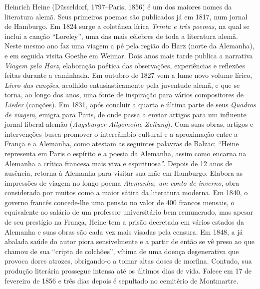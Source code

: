 \begin{resumopage}

\item[Heinrich Heine] (Düsseldorf, 1797--Paris, 1856) é um dos maiores nomes
da literatura alemã. Seus primeiros poemas são publicados já
em 1817, num jornal de Hamburgo. Em 1824 surge a coletânea lírica
\textit{Trinta e três poemas}, na qual se inclui a canção “Loreley”,
uma das mais célebres de toda a literatura alemã. Neste mesmo ano faz
uma viagem a pé pela região do Harz (norte da Alemanha), e em seguida
visita Goethe em Weimar. Dois anos mais tarde publica a narrativa
\textit{Viagem pelo Harz}, elaboração poética das observações,
experiências e reflexões feitas durante a caminhada. Em outubro de 1827
vem a lume novo volume lírico, \textit{Livro das canções}, acolhido
entusiasticamente pela juventude alemã, e que se torna, ao longo dos
anos, uma fonte de inspiração para vários compositores de
\textit{Lieder} (canções).
Em 1831, após concluir a quarta e última parte de seus \textit{Quadros
de viagem}, emigra para Paris, de onde passa a enviar artigos para um
influente jornal liberal alemão (\textit{Augsburger Allgemeine
Zeitung}). Com suas obras, artigos e intervenções busca promover o
intercâmbio cultural e a aproximação entre a França e a Alemanha, como
atestam as seguintes palavras de Balzac: “Heine representa em Paris o
espírito e a poesia da Alemanha, assim como encarna na Alemanha a
crítica francesa mais viva e espirituosa”. Depois de 12 anos de
ausência, retorna à Alemanha para visitar sua mãe em Hamburgo. Elabora
as impressões de viagem no longo poema \textit{Alemanha, um conto de
inverno}, obra considerada por muitos como a maior sátira da literatura moderna.
Em 1840, o governo francês concede{}-lhe uma pensão no valor de 400 francos
mensais, o equivalente ao salário de um professor universitário bem remunerado,
mas apesar de seu prestígio na França, Heine tem a prisão decretada em vários
estados da Alemanha e suas obras são cada vez mais visadas pela censura.
Em 1848, a já abalada saúde do autor piora sensivelmente
e a partir de então se vê preso ao que chamou de sua “cripta de
colchões”, vítima de uma doença degenerativa que provoca dores atrozes,
obrigando{}-o a tomar altas doses de morfina. Contudo, sua produção
literária prossegue intensa até os últimos dias de vida. Falece em 17
de fevereiro de 1856 e três dias depois é sepultado no cemitério de
Montmartre.


\end{resumopage}

